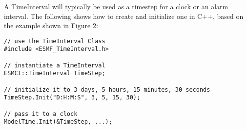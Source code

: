 
A TimeInterval will typically be used as a timestep for a clock or an alarm
interval.  The following shows how to create and initialize one in C++, based
on the example shown in Figure 2:

\begin{verbatim}
// use the TimeInterval Class
#include <ESMF_TimeInterval.h>

// instantiate a TimeInterval
ESMCI::TimeInterval TimeStep;

// initialize it to 3 days, 5 hours, 15 minutes, 30 seconds
TimeStep.Init("D:H:M:S", 3, 5, 15, 30);

// pass it to a clock
ModelTime.Init(&TimeStep, ...);
\end{verbatim}
